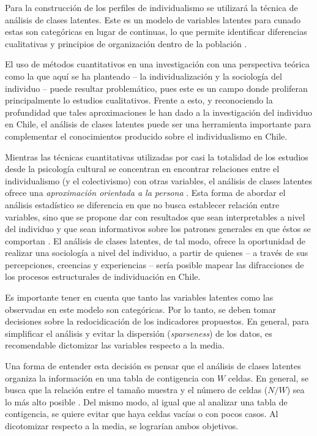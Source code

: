 \documentclass[12pt,twoside]{templates/facsothesis}
\begin{document}
Para la construcción de los perfiles de individualismo se utilizará la técnica de análisis de clases latentes. Este es un modelo de variables latentes para cunado estas son categóricas en lugar de continuas, lo que permite identificar diferencias cualitativas y principios de organización dentro de la población \citep{collins2010}.

El uso de métodos cuantitativos en una investigación con una perspectiva teórica como la que aquí se ha planteado -- la individualización y la sociología del individuo -- puede resultar problemático, pues este es un campo donde proliferan principalmente lo estudios cualitativos. Frente a esto, y reconociendo la profundidad que tales aproximaciones le han dado a la investigación del individuo en Chile, el análisis de clases latentes puede ser una herramienta importante para complementar el conocimientos producido sobre el individualismo en Chile.

Mientras las técnicas cuantitativas utilizadas por casi la totalidad de los estudios desde la psicología cultural se concentran en encontrar relaciones entre el individualismo (y el colectivismo) con otras variables, el análisis de clases latentes ofrece una \emph{aproximación orientada a la persona} \citep{collins2010}. Esta forma de abordar el análisis estadístico se diferencia en que no busca establecer relación entre variables, sino que se propone dar con resultados que sean interpretables a nivel del individuo y que sean informativos sobre los patrones generales en que éstos se comportan \citep{bergman2015}. El análisis de clases latentes, de tal modo, ofrece la oportunidad de realizar una sociología a nivel del individuo, a partir de quienes -- a través de sus percepciones, creencias y experiencias -- sería posible mapear las difracciones de los procesos estructurales de individuación en Chile.

Es importante tener en cuenta que tanto las variables latentes como las observadas en este modelo son categóricas. Por lo tanto, se deben tomar decisiones sobre la redocidicación de los indicadores propuestos. En general, para simplificar el análisis y evitar la dispersión (\emph{sparseness}) de los datos, es recomendable dictomizar las variables respecto a la media.

Una forma de entender esta decisión es pensar que el análisis de clases latentes organiza la información en una tabla de contigencia con \(W\) celdas. En general, se busca que la relación entre el tamaño muestra y el número de celdas (\(N/W\)) sea lo más alto posible \citep{collins2010}. Del mismo modo, al igual que al analizar una tabla de contigencia, se quiere evitar que haya celdas vacías o con pocos casos. Al dicotomizar respecto a la media, se lograrían ambos objetivos.
\end{document}
